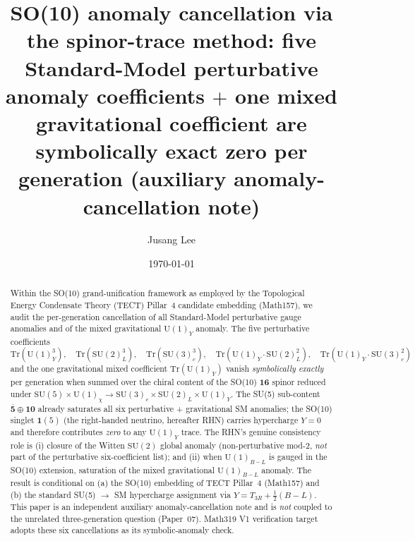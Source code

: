 \title{SO(10) anomaly cancellation via the spinor-trace method:
five Standard-Model perturbative anomaly coefficients $+$ one mixed
gravitational coefficient are symbolically exact zero per generation
(auxiliary anomaly-cancellation note)}

\author{Jusang Lee}

\date{\today}

\begin{abstract}
Within the SO(10) grand-unification framework as employed by the
Topological Energy Condensate Theory (TECT) Pillar~4 candidate
embedding (Math157), we audit the per-generation cancellation of all
Standard-Model perturbative gauge anomalies and of the mixed
gravitational $\mathrm{U}(1)_Y$ anomaly. The five perturbative
coefficients
\[
  \mathrm{Tr}(\mathrm{U}(1)_Y^3),\quad
  \mathrm{Tr}(\mathrm{SU}(2)_L^3),\quad
  \mathrm{Tr}(\mathrm{SU}(3)_c^3),\quad
  \mathrm{Tr}(\mathrm{U}(1)_Y\cdot \mathrm{SU}(2)_L^2),\quad
  \mathrm{Tr}(\mathrm{U}(1)_Y\cdot \mathrm{SU}(3)_c^2)
\]
and the one gravitational mixed coefficient
$\mathrm{Tr}(\mathrm{U}(1)_Y)$ vanish \emph{symbolically exactly} per
generation when summed over the chiral content of the SO(10)
$\mathbf{16}$ spinor reduced under
$\mathrm{SU}(5)\times\mathrm{U}(1)_\chi
\to\mathrm{SU}(3)_c\times\mathrm{SU}(2)_L\times\mathrm{U}(1)_Y$. The
SU(5) sub-content $\overline{\mathbf{5}}\oplus\mathbf{10}$ already
saturates all six perturbative + gravitational SM anomalies; the
SO(10) singlet $\mathbf{1}(5)$ (the right-handed neutrino, hereafter
RHN) carries hypercharge $Y=0$ and therefore contributes \emph{zero}
to any $\mathrm{U}(1)_Y$ trace. The RHN's genuine consistency role is
(i) closure of the Witten $\mathrm{SU}(2)$ global anomaly
(non-perturbative mod-$2$, \emph{not} part of the perturbative
six-coefficient list); and (ii) when $\mathrm{U}(1)_{B-L}$ is gauged
in the SO(10) extension, saturation of the mixed gravitational
$\mathrm{U}(1)_{B-L}$ anomaly. The result is conditional on (a) the
SO(10) embedding of TECT Pillar~4 (Math157) and (b) the standard
SU(5) $\to$ SM hypercharge assignment via
$Y = T_{3R}+\tfrac{1}{2}(B-L)$. This paper is an independent
auxiliary anomaly-cancellation note and is \emph{not} coupled to the
unrelated three-generation question (Paper~07). Math319 V1
verification target adopts these six cancellations as its
symbolic-anomaly check.
\end{abstract}

\maketitle

